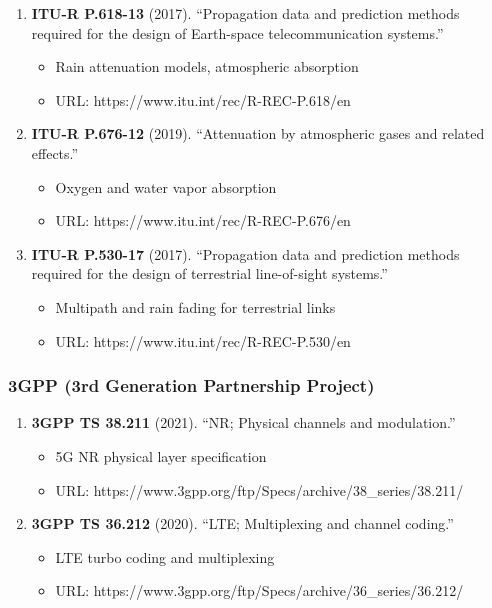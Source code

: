 \begin{enumerate}
\def\labelenumi{\arabic{enumi}.}
\setcounter{enumi}{25}
\tightlist
\item
  \textbf{ITU-R P.618-13} (2017). ``Propagation data and prediction
  methods required for the design of Earth-space telecommunication
  systems.''

  \begin{itemize}
  \tightlist
  \item
    Rain attenuation models, atmospheric absorption
  \item
    URL: https://www.itu.int/rec/R-REC-P.618/en
  \end{itemize}
\item
  \textbf{ITU-R P.676-12} (2019). ``Attenuation by atmospheric gases and
  related effects.''

  \begin{itemize}
  \tightlist
  \item
    Oxygen and water vapor absorption
  \item
    URL: https://www.itu.int/rec/R-REC-P.676/en
  \end{itemize}
\item
  \textbf{ITU-R P.530-17} (2017). ``Propagation data and prediction
  methods required for the design of terrestrial line-of-sight
  systems.''

  \begin{itemize}
  \tightlist
  \item
    Multipath and rain fading for terrestrial links
  \item
    URL: https://www.itu.int/rec/R-REC-P.530/en
  \end{itemize}
\end{enumerate}

\subsubsection{3GPP (3rd Generation Partnership
Project)}\label{gpp-3rd-generation-partnership-project}

\begin{enumerate}
\def\labelenumi{\arabic{enumi}.}
\setcounter{enumi}{28}
\tightlist
\item
  \textbf{3GPP TS 38.211} (2021). ``NR; Physical channels and
  modulation.''

  \begin{itemize}
  \tightlist
  \item
    5G NR physical layer specification
  \item
    URL: https://www.3gpp.org/ftp/Specs/archive/38\_series/38.211/
  \end{itemize}
\item
  \textbf{3GPP TS 36.212} (2020). ``LTE; Multiplexing and channel
  coding.''

  \begin{itemize}
  \tightlist
  \item
    LTE turbo coding and multiplexing
  \item
    URL: https://www.3gpp.org/ftp/Specs/archive/36\_series/36.212/
  \end{itemize}
\end{enumerate}

